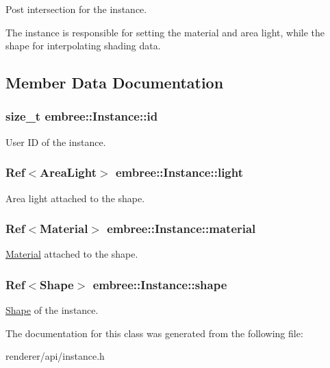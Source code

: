 Post intersection for the instance. 

The instance is responsible for setting the material and area light, while the shape for interpolating shading data. 

\subsection{Member Data Documentation}
\hypertarget{classembree_1_1_instance_ab9ba19e8d4aff6c227a838c32f6b8177}{
\subsubsection[{id}]{\setlength{\rightskip}{0pt plus 5cm}size\_\-t {\bf embree::Instance::id}}}
\label{classembree_1_1_instance_ab9ba19e8d4aff6c227a838c32f6b8177}


User ID of the instance. 

\hypertarget{classembree_1_1_instance_a49f4f82835231478a9e524a025e35461}{
\subsubsection[{light}]{\setlength{\rightskip}{0pt plus 5cm}Ref$<${\bf AreaLight}$>$ {\bf embree::Instance::light}}}
\label{classembree_1_1_instance_a49f4f82835231478a9e524a025e35461}


Area light attached to the shape. 

\hypertarget{classembree_1_1_instance_ad5fe641abd632683f5d19fbc6147451d}{
\subsubsection[{material}]{\setlength{\rightskip}{0pt plus 5cm}Ref$<${\bf Material}$>$ {\bf embree::Instance::material}}}
\label{classembree_1_1_instance_ad5fe641abd632683f5d19fbc6147451d}


\hyperlink{classembree_1_1_material}{Material} attached to the shape. 

\hypertarget{classembree_1_1_instance_aa9909b2b3ee187625a4369ca6b95d5d1}{
\subsubsection[{shape}]{\setlength{\rightskip}{0pt plus 5cm}Ref$<${\bf Shape}$>$ {\bf embree::Instance::shape}}}
\label{classembree_1_1_instance_aa9909b2b3ee187625a4369ca6b95d5d1}


\hyperlink{classembree_1_1_shape}{Shape} of the instance. 



The documentation for this class was generated from the following file:\begin{DoxyCompactItemize}
\item 
renderer/api/instance.h\end{DoxyCompactItemize}

